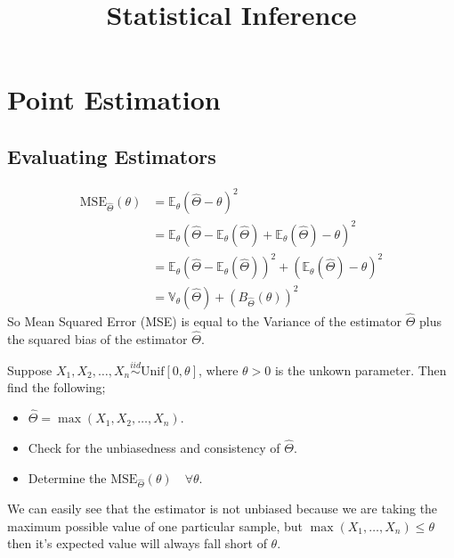 \documentclass[12pt,a4paper]{article}
\title{Statistical Inference}
\begin{document}
   \section{Point Estimation}
   
   \subsection{Evaluating Estimators}
   \begin{align*}
    \mathrm{MSE}_{\hat{\Theta}}(\theta)&=\mathbb{E}_{\theta}(\hat{\Theta}-\theta)^2 \\
    &= \mathbb{E}_{\theta}(\hat{\Theta}-\mathbb{E}_{\theta}(\hat{\Theta})+ \mathbb{E}_{\theta}(\hat{\Theta})-\theta)^2\\
    &= \mathbb{E}_{\theta}\left( \hat{\Theta} - \mathbb{E}_{\theta}(\hat{\Theta})\right)^2 + 
    \left( \mathbb{E}_{\theta}(\hat{\Theta}) - \theta \right)^2 \\  
    &= \mathbb{V}_{\theta}(\hat{\Theta})+ {(B_{\hat{\Theta}}(\theta))}^2
   \end{align*}
    So Mean Squared Error (MSE) is equal to the Variance of the estimator \(\hat{\Theta}\) plus the squared bias of the estimator \(\hat{\Theta}\).

   Suppose \(X_{1},X_{2},\ldots,X_{n} \overset{iid}{\sim} \text{Unif}[0,\theta ]\), where \(\theta>0\) is the unkown parameter. Then find the following; 
   
   \begin{itemize}
    \item \(\hat{\Theta}=\max(X_{1},X_{2},\ldots,X_{n})\).
    \item Check for the unbiasedness and consistency of \(\hat{\Theta}\).
    \item Determine the \(\mathrm{MSE}_{\hat{\Theta}}(\theta)\quad \forall \theta \).     
   \end{itemize}

   We can easily see that the estimator is not unbiased because we are taking the maximum possible value of one particular sample, 
   but \(\max(X_{1},\ldots,X_{n})\leq \theta \) then it's expected value will always fall short of \(\theta\). 
   
\end{document}
